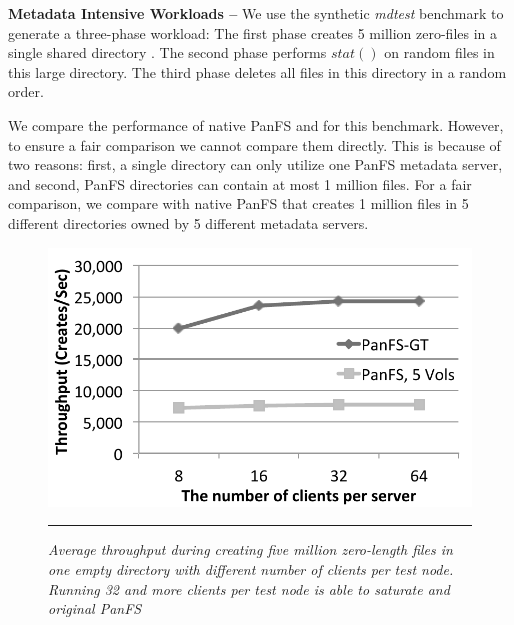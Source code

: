 \textbf{Metadata Intensive Workloads -- }
We use the synthetic {\it mdtest} benchmark to generate a three-phase workload:
The first phase creates 5 million
zero-files in a single shared directory \cite{ceph:weil06, GIGA11}.
The second phase performs $stat()$ on random files in this large directory.
The third phase deletes all files in this directory in a random order.

We compare the performance of native PanFS and \psys for this benchmark.
However, to ensure a fair comparison we cannot compare them directly. This is
because of two reasons: first, a single directory can only utilize one PanFS 
metadata server, and second, PanFS directories can contain at most 1 million 
files.
For a fair comparison, we compare \psys with native PanFS that creates 1 million 
files in 5 different directories owned by 5 different metadata servers.

\begin{figure}[t]  %
\centerline{\includegraphics[scale=0.6]{./figs/zero_file_creation_on_panfs}}
\vspace{10pt}
\caption{
\textit{Average throughput during creating five million zero-length files
in one empty directory with different number of clients per test node.
Running 32 and more clients per test node is able to saturate \psys
and original PanFS}
}
\hrule
\label{graph:creation_clients}
\end{figure}       %

